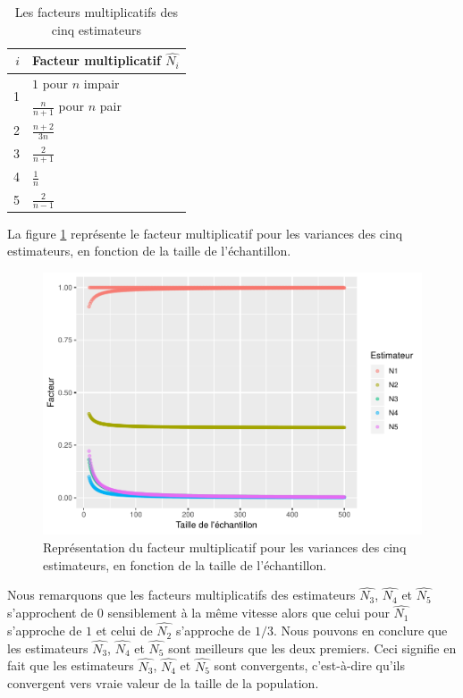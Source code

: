 \documentclass[10pt]{article}
\begin{document}
\begin{table}[ht]
\begin{center}
\begin{tabular}{rl}
\toprule
$i$ & Facteur multiplicatif $\widehat{N_i}$ \\
\midrule
\multirow{2}{*}{1} & $1$ pour $n$ impair \\[5pt]
& $\frac{n}{n+1}$ pour $n$ pair \\
\midrule
2 & $\frac{n+2}{3n}$ \\
\midrule
3 & $\frac{2}{n+1}$ \\
\midrule
4 & $\frac{1}{n}$ \\
\midrule
5 & $\frac{2}{n-1}$ \\
\bottomrule
\end{tabular}
\end{center}
\caption{\label{tab:facteur_multiplicatif}{Les facteurs multiplicatifs des cinq estimateurs}}
\end{table}

La figure \ref{fig:fig-facteur} représente le facteur multiplicatif pour
les variances des cinq estimateurs, en fonction de la taille de
l'échantillon.

\begin{figure}[!htb]

{\centering \includegraphics[width=0.9\linewidth]{serial_number_amq_files/figure-latex/fig-facteur-1} 

}

\caption{Représentation du facteur multiplicatif pour les variances des cinq estimateurs, en fonction de la taille de l'échantillon.}\label{fig:fig-facteur}
\end{figure}

Nous remarquons que les facteurs multiplicatifs des estimateurs
\(\widehat{N_3}\), \(\widehat{N_4}\) et \(\widehat{N_5}\) s'approchent
de \(0\) sensiblement à la même vitesse alors que celui pour
\(\widehat{N_1}\) s'approche de \(1\) et celui de \(\widehat{N_2}\)
s'approche de \(1/3\). Nous pouvons en conclure que les estimateurs
\(\widehat{N_3}\), \(\widehat{N_4}\) et \(\widehat{N_5}\) sont meilleurs
que les deux premiers. Ceci signifie en fait que les estimateurs
\(\widehat{N_3}\), \(\widehat{N_4}\) et \(\widehat{N_5}\) sont
convergents, c'est-à-dire qu'ils convergent vers vraie valeur de la
taille de la population.
\end{document}
